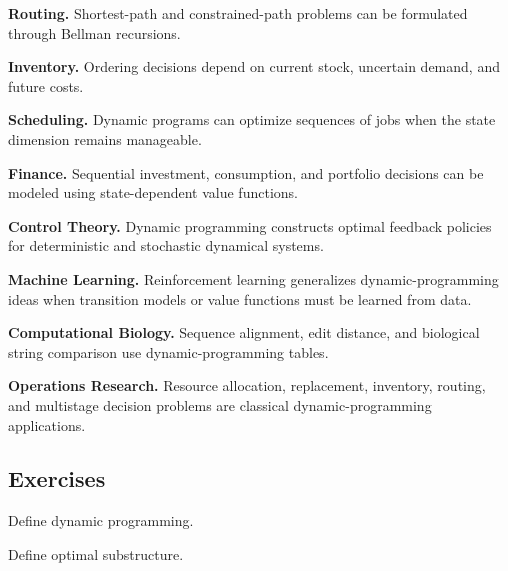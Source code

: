 \begin{applicationbox}

\textbf{Routing.}
Shortest-path and constrained-path problems can be formulated through
Bellman recursions.

\medskip

\textbf{Inventory.}
Ordering decisions depend on current stock, uncertain demand, and future
costs.

\medskip

\textbf{Scheduling.}
Dynamic programs can optimize sequences of jobs when the state dimension
remains manageable.

\medskip

\textbf{Finance.}
Sequential investment, consumption, and portfolio decisions can be
modeled using state-dependent value functions.

\medskip

\textbf{Control Theory.}
Dynamic programming constructs optimal feedback policies for deterministic
and stochastic dynamical systems.

\medskip

\textbf{Machine Learning.}
Reinforcement learning generalizes dynamic-programming ideas when
transition models or value functions must be learned from data.

\medskip

\textbf{Computational Biology.}
Sequence alignment, edit distance, and biological string comparison use
dynamic-programming tables.

\medskip

\textbf{Operations Research.}
Resource allocation, replacement, inventory, routing, and multistage
decision problems are classical dynamic-programming applications.

\end{applicationbox}

\subsection{Exercises}
\label{subsec:dynamic-programming-exercises}

\begin{exercise}[1]
Define dynamic programming.
\end{exercise}

\begin{exercise}[1]
Define optimal substructure.
\end{exercise}


